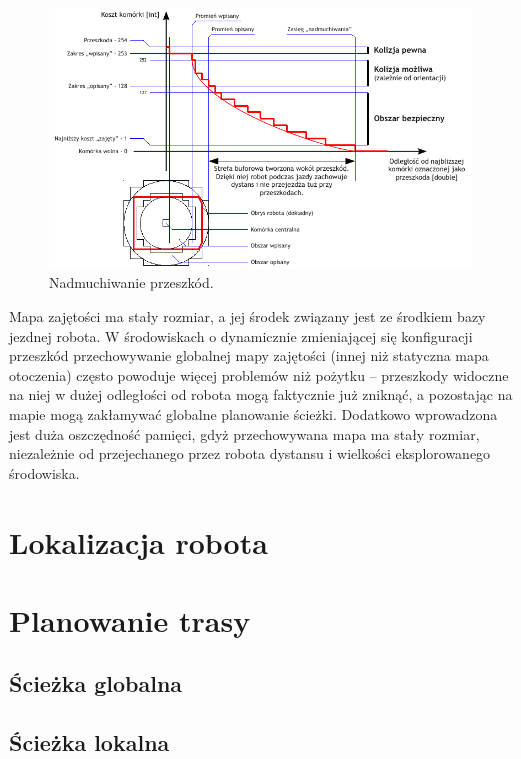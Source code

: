 \begin{figure}[htb!]
\centering
\includegraphics[width=15cm]{../../Common/img/ros/inflate.pdf}
\caption{Nadmuchiwanie przeszkód.}
\label{fig:inflation}
\end{figure} 

Mapa zajętości ma stały rozmiar, a jej środek związany jest ze środkiem bazy
jezdnej robota. W środowiskach o dynamicznie zmieniającej się konfiguracji
przeszkód przechowywanie globalnej mapy zajętości (innej niż statyczna mapa
otoczenia) często powoduje więcej problemów niż pożytku -- przeszkody widoczne
na niej w dużej odległości od robota mogą faktycznie już zniknąć, a pozostając
na mapie mogą zakłamywać globalne planowanie ścieżki. Dodatkowo wprowadzona jest
duża oszczędność pamięci, gdyż przechowywana mapa ma stały rozmiar, niezależnie
od przejechanego przez robota dystansu i wielkości eksplorowanego środowiska.

\section{Lokalizacja robota}


\section{Planowanie trasy}

\subsection{Ścieżka globalna}
\subsection{Ścieżka lokalna}
